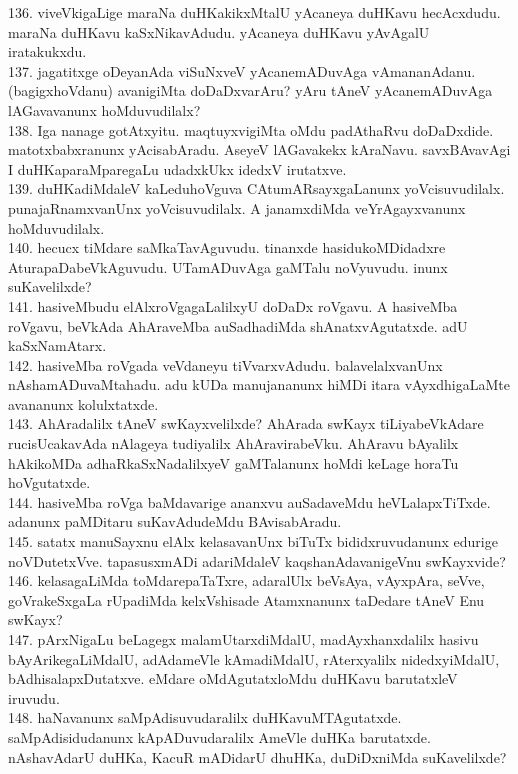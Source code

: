 \documentclass{article}
\begin{document}
136. viveVkigaLige maraNa duHKakikxMtalU yAcaneya duHKavu hecAcxdudu. maraNa duHKavu kaSxNikavAdudu. yAcaneya duHKavu yAvAgalU iratakukxdu.\\
137. jagatitxge oDeyanAda viSuNxveV yAcanemADuvAga vAmananAdanu. (bagigxhoVdanu) avanigiMta doDaDxvarAru? yAru tAneV yAcanemADuvAga lAGavavanunx hoMduvudilalx?\\
138. Iga nanage gotAtxyitu. maqtuyxvigiMta oMdu padAthaRvu doDaDxdide. matotxbabxranunx yAcisabAradu. AseyeV lAGavakekx kAraNavu. savxBAvavAgi I duHKaparaMparegaLu udadxkUkx idedxV irutatxve.\\
139. duHKadiMdaleV kaLeduhoVguva CAtumARsayxgaLanunx yoVcisuvudilalx. punajaRnamxvanUnx yoVcisuvudilalx. A janamxdiMda veYrAgayxvanunx hoMduvudilalx.\\
140. hecucx tiMdare saMkaTavAguvudu. tinanxde hasidukoMDidadxre AturapaDabeVkAguvudu. UTamADuvAga gaMTalu noVyuvudu. inunx suKavelilxde?\\
141. hasiveMbudu elAlxroVgagaLalilxyU doDaDx roVgavu. A hasiveMba roVgavu, beVkAda AhAraveMba auSadhadiMda shAnatxvAgutatxde. adU kaSxNamAtarx.\\
142. hasiveMba roVgada veVdaneyu tiVvarxvAdudu. balavelalxvanUnx nAshamADuvaMtahadu. adu kUDa manujananunx hiMDi itara vAyxdhigaLaMte avananunx kolulxtatxde.\\
143. AhAradalilx tAneV swKayxvelilxde? AhArada swKayx tiLiyabeVkAdare rucisUcakavAda nAlageya tudiyalilx AhAravirabeVku. AhAravu bAyalilx hAkikoMDa adhaRkaSxNadalilxyeV gaMTalanunx hoMdi keLage horaTu hoVgutatxde.\\
144. hasiveMba roVga baMdavarige ananxvu auSadaveMdu heVLalapxTiTxde. adanunx paMDitaru suKavAdudeMdu BAvisabAradu.\\
145. satatx manuSayxnu elAlx kelasavanUnx biTuTx bididxruvudanunx edurige noVDutetxVve. tapasusxmADi adariMdaleV kaqshanAdavanigeVnu swKayxvide?\\
146. kelasagaLiMda toMdarepaTaTxre, adaralUlx beVsAya, vAyxpAra, seVve, goVrakeSxgaLa rUpadiMda kelxVshisade Atamxnanunx taDedare tAneV Enu swKayx?\\
147. pArxNigaLu beLagegx malamUtarxdiMdalU, madAyxhanxdalilx hasivu bAyArikegaLiMdalU, adAdameVle kAmadiMdalU, rAterxyalilx nidedxyiMdalU, bAdhisalapxDutatxve. eMdare oMdAgutatxloMdu duHKavu barutatxleV iruvudu.\\
148. haNavanunx saMpAdisuvudaralilx duHKavuMTAgutatxde. saMpAdisidudanunx kApADuvudaralilx AmeVle duHKa barutatxde. nAshavAdarU duHKa, KacuR mADidarU dhuHKa, duDiDxniMda suKavelilxde?\\
\end{document}
